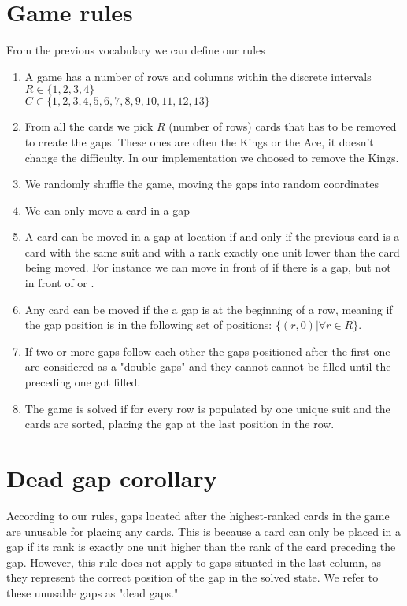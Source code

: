 \section{Game rules}
From the previous vocabulary we can define our rules
\begin{enumerate}
    \item A game has a number of rows and columns within the discrete intervals\\
    $R \in \{1, 2, 3, 4\}$\\
    $C \in \{1, 2, 3, 4, 5, 6, 7, 8, 9, 10, 11, 12, 13\}$
    \item From all the cards we pick $R$ (number of rows) cards that has to be removed to create the gaps. These ones are often the Kings or the Ace, it doesn't change the difficulty. In our implementation we choosed to remove the Kings.
    \item We randomly shuffle the game, moving the gaps into random coordinates
    \item We can only move a card in a gap
    \item A card can be moved in a gap at location if and only if the previous card is a card with the same suit and with a rank exactly one unit lower than the card being moved. For instance we can move  in front of  if there is a gap, but not in front of  or .
    \item Any card can be moved if the a gap is at the beginning of a row, meaning if the gap position is in the following set of positions: $\{(r, 0) | \forall r \in R\}$.
    \item If two or more gaps follow each other the gaps positioned after the first one are considered as a "double-gaps" and they cannot cannot be filled until the preceding one got filled.
    \item The game is solved if for every row is populated by one unique suit and the cards are sorted, placing the gap at the last position in the row.
\end{enumerate}

\section{Dead gap corollary}
According to our rules, gaps located after the highest-ranked cards in the game are unusable for placing any cards. This is because a card can only be placed in a gap if its rank is exactly one unit higher than the rank of the card preceding the gap. However, this rule does not apply to gaps situated in the last column, as they represent the correct position of the gap in the solved state. We refer to these unusable gaps as "dead gaps."

